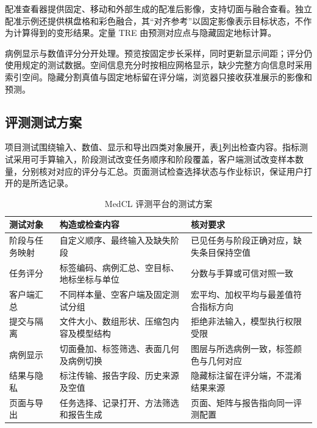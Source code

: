 配准查看器提供固定、移动和外部生成的配准后影像，支持切面与融合查看。独立配准示例还提供棋盘格和彩色融合，其“对齐参考”以固定影像表示目标状态，不作为计算得到的变形结果。定量 TRE 由预测对应点与隐藏固定地标计算。

\begin{samepage}
病例显示与数值评分分开处理。预览按固定步长采样，同时更新显示间距；评分仍使用规定的测试数据。空间信息充分时按相应网格显示，缺少完整方向信息时采用索引空间。隐藏分割真值与固定地标留在评分端，浏览器只接收获准展示的影像和预测。
\par
\end{samepage}

\subsection{评测测试方案}
\label{subsec:medcl-test-plan}
\label{subsec:medcl-current-status}

项目测试围绕输入、数值、显示和导出四类对象展开，表\ref{tab:medcl-test-plan}列出检查内容。指标测试采用可手算输入，阶段测试改变任务顺序和阶段覆盖，客户端测试改变样本数量，分别核对对应的评分与汇总。页面测试检查选择状态与作业标识，保证用户打开的是所选记录。

\begin{table}[htbp]
\centering
\caption{MedCL 评测平台的测试方案}
\label{tab:medcl-test-plan}
\thesistablefont
\setlength{\tabcolsep}{3pt}
\renewcommand{\arraystretch}{1.14}
\begin{tabularx}{\textwidth}{@{}p{2.4cm}XX@{}}
\toprule
测试对象 & 构造或检查内容 & 核对要求 \\
\midrule
阶段与任务映射 & 自定义顺序、最终输入及缺失阶段 & 已见任务与阶段正确对应，缺失条目保持空值 \\
任务评分 & 标签编码、病例汇总、空目标、地标坐标与单位 & 分数与手算或可信对照一致 \\
客户端汇总 & 不同样本量、空客户端及固定测试分组 & 宏平均、加权平均与最差值符合指标方向 \\
提交与隔离 & 文件大小、数组形状、压缩包内容及模型结构 & 拒绝非法输入，模型执行权限受限 \\
病例显示 & 切面叠加、标签筛选、表面几何及病例切换 & 图层与所选病例一致，标签颜色与几何对应 \\
结果与隐私 & 标注传输、报告字段、历史来源及空值 & 隐藏标注留在评分端，不混淆结果来源 \\
页面与导出 & 任务选择、记录打开、方法筛选和报告生成 & 页面、矩阵与报告指向同一评测配置 \\
\bottomrule
\end{tabularx}
\end{table}

